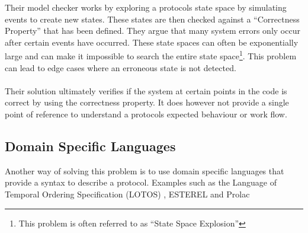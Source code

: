 Their model checker works by exploring a protocols state space by simulating events to create new states. These states are then checked against a ``Correctness Property'' that has been defined. They argue that many system errors only occur after certain events have occurred. These state spaces can often be exponentially large and can make it impossible to search the entire state space\footnote{This problem is often referred to as ``State Space Explosion''}. This problem can lead to edge cases where an erroneous state is not detected.
\\\\
Their solution ultimately verifies if the system at certain points in the code is correct by using the correctness property. It does however not provide a single point of reference to understand a protocols expected behaviour or work flow.

\subsection{Domain Specific Languages}
Another way of solving this problem is to use domain specific languages that provide a syntax to describe a protocol. Examples such as the Language of Temporal Ordering Specification  (LOTOS) \cite{bolognesi1987introduction}, ESTEREL \cite{boussinot1991esterel} and Prolac \cite{kohler1999readable}

